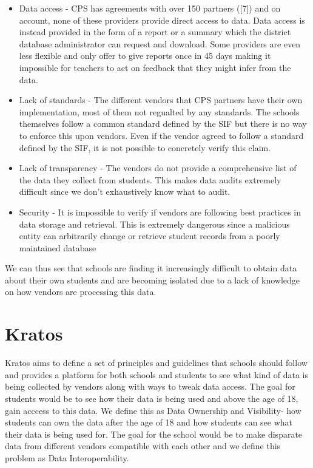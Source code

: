 \documentclass{article}
\begin{document}
\begin{itemize}
  \item Data access - CPS has agreements with over 150 partners ([7]) and on account, none of these providers provide direct access to data. Data access is instead provided in the form of a report or a summary which the district database administrator can request and download. Some providers are even less flexible and only offer to give reports once in 45 days making it impossible for teachers to act on feedback that they might infer from the data.
  \item Lack of standards - The different vendors that CPS partners have their own implementation, most of them not regualted by any standards. The schools themselves follow a common standard defined by the SIF but there is no way to enforce this upon vendors. Even if the vendor agreed to follow a standard defined by the SIF, it is not possible to concretely verify this claim.
  \item Lack of transparency - The vendors do not provide a comprehensive list of the data they collect from students. This makes data audits extremely difficult since we don't exhaustively know what to audit.
  \item Security - It is impossible to verify if vendors are following best practices in data storage and retrieval. This is extremely dangerous since a malicious entity can arbitrarily change or retrieve student records from a poorly maintained database
\end{itemize}

We can thus see that schools are finding it increasingly difficult to obtain data about their own students and are becoming isolated due to a lack of knowledge on how vendors are processing this data.

\section{Kratos}
Kratos aims to define a set of principles and guidelines that schools should follow and provides a platform for both schools and students to see what kind of data is being collected by vendors along with ways to tweak data access. The goal for students would be to see how their data is being used and above the age of 18, gain acccess to this data. We define this as Data Ownership and Visibility- how students can own the data after the age of 18 and how students can see what their data is being used for. The goal for the school would be to make disparate data from different vendors compatible with each other and we define this problem as Data Interoperability.
\end{document}

